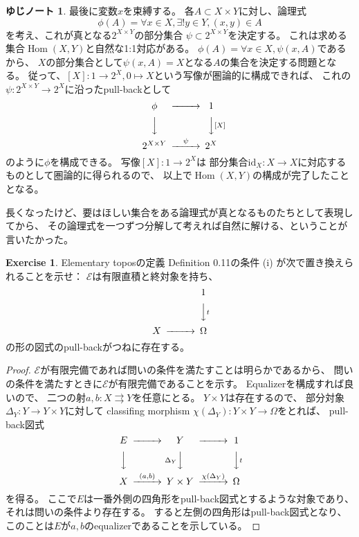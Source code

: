 \documentclass[uplatex]{jsarticle}
\theoremstyle{definition}
\newtheorem{prob}[prob]{Exercise}
\newtheorem*{rrem*}{ゆじノート}
\def\id{\mathrm{id}}
\DeclareMathOperator{\Hom}{Hom}
\def\mcE{\mathcal{E}}
\begin{document}
\begin{rrem*}
  最後に変数\(x\)を束縛する。
  各\(A\subset X\times Y\)に対し、論理式
  \[
  \phi(A) = \forall x\in X, \exists! y\in Y, (x,y)\in A
  \]
  を考え、これが真となる\(2^{X\times Y}\)の部分集合
  \(\psi \subset 2^{X\times Y}\)を決定する。
  これは求める集合\(\Hom(X,Y)\)と自然な1:1対応がある。
  \(\phi(A) = \forall x\in X, \psi(x,A)\)であるから、
  \(X\)の部分集合として\(\psi(x,A) = X\)となる\(A\)の集合を決定する問題となる。
  従って、\(\left[ X \right]: 1 \to 2^X , 0 \mapsto X\)という写像が圏論的に構成できれば、
  これの\(\psi:2^{X\times Y}\to 2^X\)に沿ったpull-backとして
  \[
  \begin{CD}
    \phi @>>> 1 \\
    @VVV @VV \left[ X \right] V \\
    2^{X\times Y} @>\psi >> 2^X
  \end{CD}
  \]
  のように\(\phi\)を構成できる。
  写像\(\left[ X \right] : 1\to 2^X\)は
  部分集合\(\id_X:X\to X\)に対応するものとして圏論的に得られるので、
  以上で\(\Hom(X,Y)\)の構成が完了したこととなる。

  長くなったけど、要はほしい集合をある論理式が真となるものたちとして表現してから、
  その論理式を一つずつ分解して考えれば自然に解ける、ということが言いたかった。
\end{rrem*}




\begin{prob}\label{prob: 1.2}
  Elementary toposの定義 Definition 0.11の条件 (i) が次で置き換えられることを示せ：
  \(\mcE\)は有限直積と終対象を持ち、
  \[
  \begin{CD}
    @. 1 \\
    @. @VVtV \\
    X @>>> \Omega
  \end{CD}
  \]
  の形の図式のpull-backがつねに存在する。
\end{prob}

\begin{proof}
  \(\mcE\)が有限完備であれば問いの条件を満たすことは明らかであるから、
  問いの条件を満たすときに\(\mcE\)が有限完備であることを示す。
  Equalizerを構成すれば良いので、
  二つの射\(a,b:X\rightrightarrows Y\)を任意にとる。
  \(Y\times Y\)は存在するので、
  部分対象\(\Delta_Y:Y\to Y\times Y\)に対して
  classifing morphism \(\chi(\Delta_Y) : Y\times Y\to \Omega\)をとれば、
  pull-back図式
  \[
  \begin{CD}
    E @>>> Y @>>> 1 \\
    @VVV @V\Delta_Y VV @VV t V \\
    X @>(a,b)>> Y\times Y @>\chi(\Delta_Y)>> \Omega
  \end{CD}
  \]
  を得る。
  ここで\(E\)は一番外側の四角形をpull-back図式とするような対象であり、
  それは問いの条件より存在する。
  すると左側の四角形はpull-back図式となり、
  このことは\(E\)が\(a,b\)のequalizerであることを示している。
\end{proof}
\end{document}
